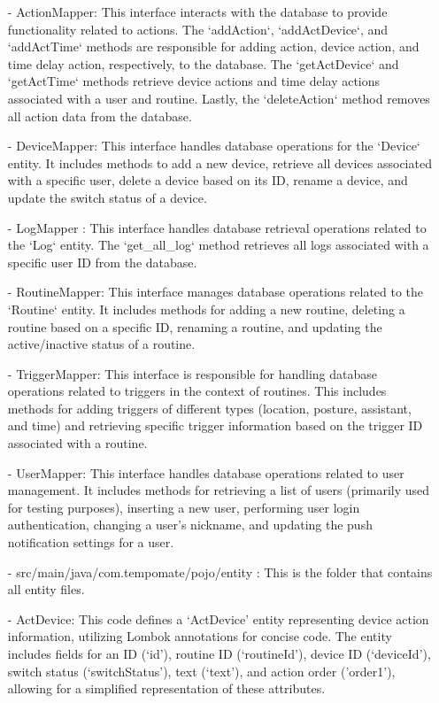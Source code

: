 \begin{enumerate}
    \item[-] ActionMapper: This interface interacts with the database to provide functionality related to actions. The `addAction`, `addActDevice`, and `addActTime` methods are responsible for adding action, device action, and time delay action, respectively, to the database. The `getActDevice` and `getActTime` methods retrieve device actions and time delay actions associated with a user and routine. Lastly, the `deleteAction` method removes all action data from the database. \\
    \item[-] DeviceMapper: This interface handles database operations for the `Device` entity. It includes methods to add a new device, retrieve all devices associated with a specific user, delete a device based on its ID, rename a device, and update the switch status of a device. \\
    \item[-] LogMapper : This interface handles database retrieval operations related to the `Log` entity. The `get\_all\_log` method retrieves all logs associated with a specific user ID from the database.\\
    \item[-] RoutineMapper: This interface manages database operations related to the `Routine` entity. It includes methods for adding a new routine, deleting a routine based on a specific ID, renaming a routine, and updating the active/inactive status of a routine. \\
    \item[-] TriggerMapper: This interface is responsible for handling database operations related to triggers in the context of routines. This includes methods for adding triggers of different types (location, posture, assistant, and time) and retrieving specific trigger information based on the trigger ID associated with a routine. \\
    \item[-] UserMapper: This interface handles database operations related to user management. It includes methods for retrieving a list of users (primarily used for testing purposes), inserting a new user, performing user login authentication, changing a user's nickname, and updating the push notification settings for a user. \\
    \item[-] src/main/java/com.tempomate/pojo/entity : This is the folder that contains all entity files. \\
    \item[-] ActDevice: This code defines a ‘ActDevice' entity representing device action information, utilizing Lombok annotations for concise code. The entity includes fields for an ID (‘id’), routine ID (‘routineId’), device ID (‘deviceId’), switch status (‘switchStatus’), text (‘text’), and action order ('order1'), allowing for a simplified representation of these attributes.\\

\end{enumerate}

